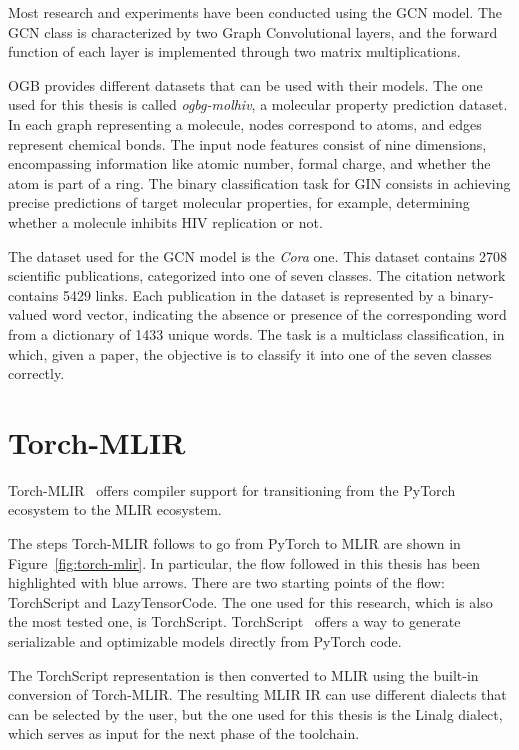 Most research and experiments have been conducted using the GCN model.
The GCN class is characterized by two Graph Convolutional layers, and the forward function of each layer is implemented through two matrix multiplications.

OGB provides different datasets that can be used with their models.
The one used for this thesis is called \textit{ogbg-molhiv}, a molecular property prediction dataset.
In each graph representing a molecule, nodes correspond to atoms, and edges represent chemical bonds.
The input node features consist of nine dimensions, encompassing information like atomic number, formal charge, and whether the atom is part of a ring.
The binary classification task for GIN consists in achieving precise predictions of target molecular properties, for example, determining whether a molecule inhibits HIV replication or not.

The dataset used for the GCN model is the \textit{Cora} one.
This dataset contains 2708 scientific publications, categorized into one of seven classes.
The citation network contains 5429 links.
Each publication in the dataset is represented by a binary-valued word vector, indicating the absence or presence of the corresponding word from a dictionary of 1433 unique words.
The task is a multiclass classification, in which, given a paper, the objective is to classify it into one of the seven classes correctly.

\section{Torch-MLIR}
\label{sec:toolchain-torch_mlir}%

Torch-MLIR~\cite{torch_mlir} offers compiler support for transitioning from the PyTorch ecosystem to the MLIR ecosystem.

The steps Torch-MLIR follows to go from PyTorch to MLIR are shown in Figure~\ref{fig:torch-mlir}.
In particular, the flow followed in this thesis has been highlighted with blue arrows.
There are two starting points of the flow: TorchScript and LazyTensorCode.
The one used for this research, which is also the most tested one, is TorchScript.
TorchScript~\cite{torchscript} offers a way to generate serializable and optimizable models directly from PyTorch code.

The TorchScript representation is then converted to MLIR using the built-in conversion of Torch-MLIR. The resulting MLIR IR can use different dialects that can be selected by the user, but the one used for this thesis is the Linalg dialect, which serves as input for the next phase of the toolchain.

